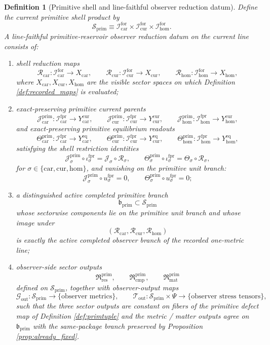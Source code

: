 \documentclass[11pt]{article}
\newcommand{\PrimShell}{\mathcal S_{\mathrm{prim}}}
\newcommand{\PrimBranch}{\mathfrak b_{\mathrm{prim}}}
\newcommand{\MetricOut}{\mathscr G_{\mathrm{out}}}
\newcommand{\MatterOut}{\mathscr T_{\mathrm{out}}}
\newcommand{\Car}{\mathrm{car}}
\newcommand{\Cur}{\mathrm{cur}}
\newcommand{\Hom}{\mathrm{hom}}
\newcommand{\ForPrimSpace}[1]{\mathcal I_{#1}^{\mathrm{fpr}}}
\newcommand{\ForSpace}[1]{\mathcal I_{#1}^{\mathrm{for}}}
\newcommand{\ForPrimInc}[1]{\iota_{#1}^{\mathrm{fpr}}}
\newcommand{\ForPrimUnit}[1]{u_{#1}^{\mathrm{fpr}}}
\newcommand{\Reduction}[1]{\mathcal R_{#1}}
\newcommand{\ObsCurrent}[1]{\mathcal J_{#1}}
\newcommand{\ObsTheta}[1]{\Theta_{#1}}
\newcommand{\PrimCurrent}[1]{\mathcal J_{#1}^{\mathrm{prim}}}
\newcommand{\PrimTheta}[1]{\Theta_{#1}^{\mathrm{prim}}}
\newcommand{\PrimResidualSector}{\mathfrak R_{\mathrm{res}}^{\mathrm{prim}}}
\newcommand{\PrimCompletionSector}{\mathfrak R_{\mathrm{cmp}}^{\mathrm{prim}}}
\newcommand{\PrimMatterSector}{\mathfrak R_{\mathrm{mat}}^{\mathrm{prim}}}
\newtheorem{definition}{Definition}
\begin{document}
\begin{definition}[Primitive shell and line-faithful observer reduction datum]
\label{def:datum}
Define the current primitive shell product by
\[
\PrimShell
\equiv
\ForSpace{\Car}\times\ForSpace{\Cur}\times\ForSpace{\Hom}.
\]
A \emph{line-faithful primitive-reservoir observer reduction datum} on the current line consists of:
\begin{enumerate}
    \item shell reduction maps
    \[
    \Reduction{\Car}:\ForSpace{\Car}\to X_{\Car},\qquad
    \Reduction{\Cur}:\ForSpace{\Cur}\to X_{\Cur},\qquad
    \Reduction{\Hom}:\ForSpace{\Hom}\to X_{\Hom},
    \]
    where \(X_{\Car},X_{\Cur},X_{\Hom}\) are the visible sector spaces on which Definition \ref{def:recorded_maps} is evaluated;
    \item exact-preserving primitive current parents
    \[
    \PrimCurrent{\Car}:\ForPrimSpace{\Car}\to Y_{\Car}^{\mathrm{cur}},\qquad
    \PrimCurrent{\Cur}:\ForPrimSpace{\Cur}\to Y_{\Cur}^{\mathrm{cur}},\qquad
    \PrimCurrent{\Hom}:\ForPrimSpace{\Hom}\to Y_{\Hom}^{\mathrm{cur}},
    \]
    and exact-preserving primitive equilibrium readouts
    \[
    \PrimTheta{\Car}:\ForPrimSpace{\Car}\to Y_{\Car}^{\mathrm{eq}},\qquad
    \PrimTheta{\Cur}:\ForPrimSpace{\Cur}\to Y_{\Cur}^{\mathrm{eq}},\qquad
    \PrimTheta{\Hom}:\ForPrimSpace{\Hom}\to Y_{\Hom}^{\mathrm{eq}},
    \]
    satisfying the shell restriction identities
    \begin{equation}
    \PrimCurrent{\sigma}\circ\ForPrimInc{\sigma}
    =
    \ObsCurrent{\sigma}\circ\Reduction{\sigma},
    \qquad
    \PrimTheta{\sigma}\circ\ForPrimInc{\sigma}
    =
    \ObsTheta{\sigma}\circ\Reduction{\sigma},
    \label{eq:shell_restriction}
    \end{equation}
    for \(\sigma\in\{\Car,\Cur,\Hom\}\), and vanishing on the primitive unit branch:
    \[
    \PrimCurrent{\sigma}\circ\ForPrimUnit{\sigma}=0,
    \qquad
    \PrimTheta{\sigma}\circ\ForPrimUnit{\sigma}=0;
    \]
    \item a distinguished active completed primitive branch
    \[
    \PrimBranch\subset \PrimShell
    \]
    whose sectorwise components lie on the primitive unit branch and whose image under
    \[
    (\Reduction{\Car},\Reduction{\Cur},\Reduction{\Hom})
    \]
    is exactly the active completed observer branch of the recorded one-metric line;
    \item observer-side sector outputs
    \[
    \PrimResidualSector,\qquad
    \PrimCompletionSector,\qquad
    \PrimMatterSector
    \]
    defined on \(\PrimShell\), together with observer-output maps
    \[
    \MetricOut:\PrimShell\to\{\text{observer metrics}\},
    \qquad
    \MatterOut:\PrimShell\times\Psi\to\{\text{observer stress tensors}\},
    \]
    such that the three sector outputs are constant on fibers of the primitive defect map of Definition \ref{def:primtuple} and the metric / matter outputs agree on \(\PrimBranch\) with the same-package branch preserved by Proposition \ref{prop:already_fixed}.
\end{enumerate}
\end{definition}
\end{document}
